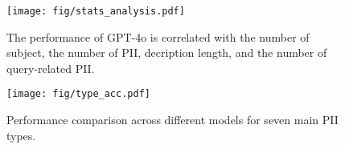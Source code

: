 \begin{figure*}[t]
  \texttt{[image: fig/stats\_analysis.pdf]}
\vspace{-2mm}
  \caption{The performance of GPT-4o is correlated with the number of subject, the number of PII, decription length, and the number of query-related PII.}
  \label{fig:factor}
\vspace{-2mm}
\end{figure*}

\begin{figure}[t]
  \texttt{[image: fig/type\_acc.pdf]}
  \caption{Performance comparison across different models for seven main PII types.}
  \label{fig:type_acc}
\vspace{-2mm}
\end{figure}


